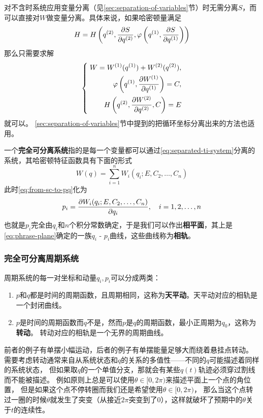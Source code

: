 \documentclass[UTF8, a4paper]{ctexart}
\begin{document}
对不含时系统应用变量分离（见\ref{sec:separation-of-variables}节）时无需分离$S$，而可以直接对$W$做变量分离。具体来说，如果哈密顿量满足
\begin{equation}
    H = H \left( q^{(2)}, \pdv{S}{q^{(2)}}, \varphi \left(
        q^{(1)}, \pdv{S}{q^{(1)}}
    \right) \right)
\end{equation}
那么只需要求解
\begin{equation}
    \left\{ \;
        \begin{aligned}
            W = W^{(1)}(q^{(1)}) + W^{(2)}(q^{(2)}), \\
            \varphi \left( q^{(1)}, \pdv{W^{(1)}}{q^{(1)}} \right) = C, \\
            H \left( q^{(2)}, \pdv{W^{(2)}}{q^{(2)}}, C \right) = E
        \end{aligned}
    \right.
    \label{eq:separated-ti-system}
\end{equation}
就可以。
\ref{sec:separation-of-variables}节中提到的把循环坐标分离出来的方法也适用。

一个\textbf{完全可分离系统}指的是每一个变量都可以通过\eqref{eq:separated-ti-system}分离的系统，其哈密顿特征函数具有下面的形式
\begin{equation}
    W(q) = \sum_{i=1}^n W_i (q_i; E, C_2, \ldots, C_n)
    \label{eq:completely-separation}
\end{equation}
此时\eqref{eq:from-sc-to-pq}化为
\begin{equation}
    p_i = \pdv{W_i(q_i;E, C_2, \ldots, C_n)}{q_i}, \quad i = 1, 2, \ldots, n
    \label{eq:phrase-plane}
\end{equation}
也就是$p_i$完全由$q_i$和$n$个积分常数确定，于是我们可以作出\textbf{相平面}，其上是\eqref{eq:phrase-plane}确定的一族$q_i$ - $p_i$曲线，这些曲线称为\textbf{相轨}。

\subsubsection{完全可分离周期系统}

周期系统的每一对坐标和动量$q_i, p_i$可以分成两类：
\begin{enumerate}
    \item $p$和$q$都是时间的周期函数，且周期相同，这称为\textbf{天平动}。天平动对应的相轨是一个封闭曲线。
    \item $p$是时间的周期函数而$q$不是，然而$p$是$q$的周期函数，最小正周期为$q_0$，这称为\textbf{转动}。
    转动对应的相轨是一个无界的周期曲线。
\end{enumerate}
前者的例子有单摆小幅运动，后者的例子有单摆能量足够大而绕着悬挂点转动。
需要考虑转动通常来自从系统状态和$q$的关系的多值性——不同的$q$可能描述着同样的系统状态，
但如果取$q$的一个单值分支，那就会有某些$q(t)$轨迹必须穿过割线而不能被描述。
例如原则上总是可以使用$\theta \in [0, 2\pi)$来描述平面上一个点的角位置，
但是如果这个点不停转圈而我们还是希望使用$\theta \in [0, 2\pi)$，
那么当这个点转过一圈的时候$\theta$就发生了突变（从接近$2\pi$突变到了$0$），这样就破坏了预期中的$\theta$关于$t$的连续性。
\end{document}
